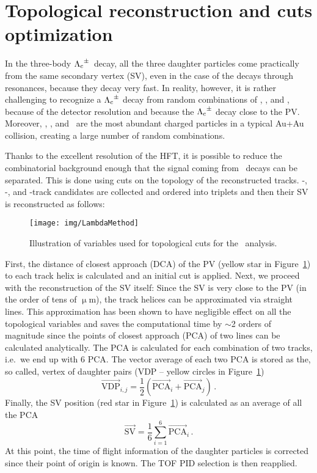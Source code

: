 \section{Topological reconstruction and cuts optimization}

In the three-body ${\Lambda_\text{c}}^\pm$\ decay, all the three daughter particles come practically from the same secondary vertex (SV), even in the case of the decays through resonances, because they decay very fast\@. In reality, however, it is rather challenging to recognize a ${\Lambda_\text{c}}^\pm$ decay from random combinations of \pipm, \Kmp, and \ppm, because of the detector resolution and because the ${\Lambda_\text{c}}^\pm$ decay close to the PV\@. Moreover, \pipm, \Kmp, and \ppm\ are the most abundant charged particles in a typical Au+Au collision, creating a large number of random combinations.

Thanks to the excellent resolution of the HFT, it is possible to reduce the combinatorial background enough that the signal coming from \Lambdac\ decays can be separated. This is done using cuts on the topology of the reconstructed tracks. \pipm-, \Kmp-, and \ppm-track candidates are collected and ordered into triplets and then their SV is reconstructed as follows:

\begin{figure}[!htb]
\centering
\texttt{[image: img/LambdaMethod]}
\caption{\label{fig:method}Illustration of variables used for topological cuts for the \Lambdac\ analysis.}
\end{figure}

First, the distance of closest approach (DCA) of the PV (yellow star in Figure~\ref{fig:method}) to each track helix is calculated and an initial cut is applied. Next, we proceed with the reconstruction of the SV itself\@: Since the SV is very close to the PV (in the order of tens of $\upmu$m), the track helices can be approximated via straight lines. This approximation has been shown to have negligible effect on all the topological variables and saves the computational time by $\sim$2 orders of magnitude since the points of closest approach (PCA) of two lines can be calculated analytically. The PCA is calculated for each combination of two tracks, i.e.\ we end up with 6 PCA\@. The vector average of each two PCA is stored as the, so called, vertex of daughter pairs (VDP -- yellow circles in Figure~\ref{fig:method})
\begin{equation}
\overrightarrow{\mathrm{VDP}}_{i,j} = \frac{1}{2} \left( \overrightarrow{\mathrm{PCA}}_i + \overrightarrow{\mathrm{PCA}}_j \right)\,. 
\end{equation}
Finally, the SV position (red star in Figure~\ref{fig:method}) is calculated as an average of all the PCA
\begin{equation}
\overrightarrow{\mathrm{SV}}=\frac{1}{6}\sum_{i=1}^6 \overrightarrow{\mathrm{PCA}}_i \,.
\end{equation}
At this point, the time of flight information of the daughter particles is corrected since their point of origin is known. The TOF PID selection is then reapplied.


